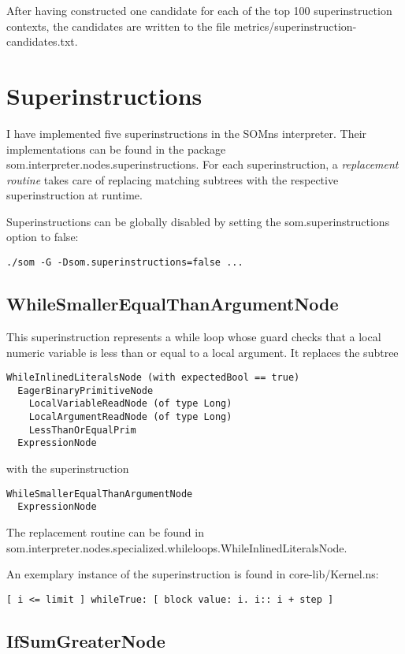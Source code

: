 \documentclass[10pt,a4paper]{article}
\begin{document}
After having constructed one candidate for each of the top 100 superinstruction contexts, the candidates are written to the file \textsf{metrics/superinstruction-candidates.txt}.

\section{Superinstructions}\label{sec:superinst}

I have implemented five superinstructions in the SOMns interpreter. Their implementations can be found in the package \textsf{som.interpreter.{\allowbreak}nodes.superinstructions}. For each superinstruction, a \emph{replacement routine} takes care of replacing matching subtrees with the respective superinstruction at runtime.

Superinstructions can be globally disabled by setting the \textsf{som.superinstructions} option to \textsf{false}:

\begin{verbatim}
./som -G -Dsom.superinstructions=false ...
\end{verbatim}

\subsection{WhileSmallerEqualThanArgumentNode}

This superinstruction represents a \textsf{while} loop whose guard checks that a local numeric variable is less than or equal to a local argument. It replaces the subtree
\begin{verbatim}
WhileInlinedLiteralsNode (with expectedBool == true)
  EagerBinaryPrimitiveNode
    LocalVariableReadNode (of type Long)
    LocalArgumentReadNode (of type Long)
    LessThanOrEqualPrim
  ExpressionNode
\end{verbatim}
with the superinstruction
\begin{verbatim}
WhileSmallerEqualThanArgumentNode
  ExpressionNode
\end{verbatim}
The replacement routine can be found in \textsf{som.interpreter.nodes.specialized.whileloops{\allowbreak}.WhileInlinedLiteralsNode}.

An exemplary instance of the superinstruction is found in \textsf{core-lib/Kernel.ns}:
\begin{verbatim}
[ i <= limit ] whileTrue: [ block value: i. i:: i + step ]
\end{verbatim}

\subsection{IfSumGreaterNode}
\end{document}
